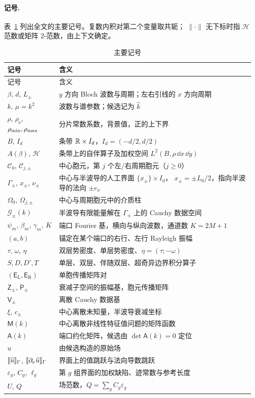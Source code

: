 \paragraph{记号.}
表~\ref{tab:notation} 列出全文的主要记号。复数内积对第二个变量取共轭；
$\lVert\cdot\rVert$ 无下标时指 $\mathcal H$ 范数或矩阵 $2$-范数，由上下文确定。

\begin{longtable}{p{}p{}}
  \caption{主要记号}\label{tab:notation}\\
  \toprule
  记号 & 含义\\
  \midrule
  \endfirsthead
  \toprule
  记号 & 含义\\
  \midrule
  \endhead
  \bottomrule
  \endfoot
  $\beta$, $d$, $L_\pm$ & $y$ 方向 Bloch 波数与周期；左右引线的 $x$ 方向周期\\
  $k$, $\mu=k^2$ & 波数与谱参数；候选记为 $\widehat k$\\
  $\rho$, $\rho_{\mathrm e}$, $\rho_{\min},\rho_{\max}$ & 分片常数系数，背景值，正的上下界\\
  $B$, $I_d$ & 条带 $\mathbb{R}\times I_d$，$I_d=(-d/2,d/2)$\\
  $A(\beta)$, $\mathcal H$ & 条带上的自伴算子及加权空间 $L^2(B,\rho\,\dd x\,\dd y)$\\
  $\mathcal C_0$, $\mathcal C_{j,\pm}$ & 中心胞元，第 $j$ 个左/右周期胞元（$j\geq0$）\\
  $\Gamma_\pm$, $x_\pm$, $\nu_\pm$ & 中心与半波导的人工界面 $\{x_\pm\}\times I_d$，
    $x_\pm=\pm L_0/2$，指向半波导的法向 $\pm e_x$\\
  $\Omega_0$, $\Omega_{j,\pm}$ & 中心与周期胞元中的介质柱\\
  $\mathcal G_\pm(k)$ & 半波导有限能量解在 $\Gamma_\pm$ 上的 Cauchy 数据空间\\
  $\psi_m$, $\beta_m$, $\gamma_m$, $K$ & 端口 Fourier 基，横向与纵向波数，通道数
    $K=2M+1$\\
  $(a,b)$ & 锚定在某个端口的右行、左行 Rayleigh 振幅\\
  $\tau$, $\omega$, $\eta$ & 双层势密度、单层势密度、$\eta=(\tau;-\omega)$\\
  $S,D,D',T$ & 单层、双层、伴随双层、超奇异边界积分算子\\
  $(\mathsf E_{\mathrm L},\mathsf E_{\mathrm R})$ & 单胞传播矩阵对\\
  $\mathsf Z_\pm$, $\mathsf P_\pm$ & 衰减子空间的振幅基，胞元传播矩阵\\
  $\mathsf V_\pm$ & 离散 Cauchy 数据基\\
  $\xi$, $c_\pm$ & 中心离散未知量，半波导衰减坐标\\
  $\mathsf M(k)$ & 中心离散非线性特征值问题的矩阵函数\\
  $\mathsf A(k)$ & 端口约化矩阵，候选由 $\det\mathsf A(k)=0$ 定位\\
  $\widehat u$ & 由候选构造的原始场\\
  $\llbracket \widehat u\rrbracket_\Gamma$, $\llbracket \partial_\nu\widehat u\rrbracket_\Gamma$ &
    界面上的值跳跃与法向导数跳跃\\
  $\varepsilon_g$, $C_g$, $\ell_g$ & 第 $g$ 组界面的加权缺陷、迹常数与参考长度\\
  $U$, $Q$ & 场范数，$Q=\sum_g C_g\varepsilon_g$\\
\end{longtable}
